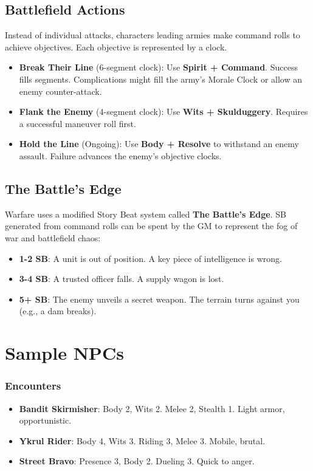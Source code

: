 \subsection*{Battlefield Actions}

Instead of individual attacks, characters leading armies make command rolls to achieve objectives. Each objective is represented by a clock.
\begin{itemize}
    \item \textbf{Break Their Line} (6-segment clock): Use \textbf{Spirit + Command}. Success fills segments. Complications might fill the army's Morale Clock or allow an enemy counter-attack.
    \item \textbf{Flank the Enemy} (4-segment clock): Use \textbf{Wits + Skulduggery}. Requires a successful maneuver roll first.
    \item \textbf{Hold the Line} (Ongoing): Use \textbf{Body + Resolve} to withstand an enemy assault. Failure advances the enemy's objective clocks.
\end{itemize}

\subsection*{The Battle's Edge}

Warfare uses a modified Story Beat system called \textbf{The Battle's Edge}. SB generated from command rolls can be spent by the GM to represent the fog of war and battlefield chaos:
\begin{itemize}
    \item \textbf{1-2 SB}: A unit is out of position. A key piece of intelligence is wrong.
    \item \textbf{3-4 SB}: A trusted officer falls. A supply wagon is lost.
    \item \textbf{5+ SB}: The enemy unveils a secret weapon. The terrain turns against you (e.g., a dam breaks).
\end{itemize}

\section*{Sample NPCs}

\subsubsection*{Encounters}

\begin{itemize}
    \item \textbf{Bandit Skirmisher}: Body 2, Wits 2. Melee 2, Stealth 1. Light armor, opportunistic.
    \item \textbf{Ykrul Rider}: Body 4, Wits 3. Riding 3, Melee 3. Mobile, brutal.
    \item \textbf{Street Bravo}: Presence 3, Body 2. Dueling 3. Quick to anger.
\end{itemize}

